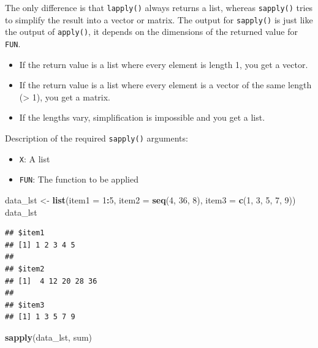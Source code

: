 \documentclass[
]{book}
\newenvironment{Shaded}{\begin{snugshade}}{\end{snugshade}}
\newcommand{\DataTypeTok}[1]{\textcolor[rgb]{0.13,0.29,0.53}{#1}}
\newcommand{\DecValTok}[1]{\textcolor[rgb]{0.00,0.00,0.81}{#1}}
\newcommand{\KeywordTok}[1]{\textcolor[rgb]{0.13,0.29,0.53}{\textbf{#1}}}
\newcommand{\NormalTok}[1]{#1}
\newcommand{\OperatorTok}[1]{\textcolor[rgb]{0.81,0.36,0.00}{\textbf{#1}}}
\newcommand{\StringTok}[1]{\textcolor[rgb]{0.31,0.60,0.02}{#1}}
\providecommand{\tightlist}{%
  \setlength{\itemsep}{0pt}\setlength{\parskip}{0pt}}
\begin{document}
The only difference is that \texttt{lapply()} always returns a list, whereas \texttt{sapply()} tries to simplify the result into a vector or matrix. The output for \texttt{sapply()} is just like the output of \texttt{apply()}, it depends on the dimensions of the returned value for \texttt{FUN}.

\begin{itemize}
\item
  If the return value is a list where every element is length 1, you get a vector.
\item
  If the return value is a list where every element is a vector of the same length (\textgreater{} 1), you get a matrix.
\item
  If the lengths vary, simplification is impossible and you get a list.
\end{itemize}

Description of the required \texttt{sapply()} arguments:

\begin{itemize}
\tightlist
\item
  \texttt{X}: A list
\item
  \texttt{FUN}: The function to be applied
\end{itemize}

\begin{Shaded}
\begin{Highlighting}[]
\NormalTok{data_lst <-}\StringTok{ }\KeywordTok{list}\NormalTok{(}\DataTypeTok{item1 =} \DecValTok{1}\OperatorTok{:}\DecValTok{5}\NormalTok{, }\DataTypeTok{item2 =} \KeywordTok{seq}\NormalTok{(}\DecValTok{4}\NormalTok{, }\DecValTok{36}\NormalTok{, }\DecValTok{8}\NormalTok{), }\DataTypeTok{item3 =} \KeywordTok{c}\NormalTok{(}\DecValTok{1}\NormalTok{,}
    \DecValTok{3}\NormalTok{, }\DecValTok{5}\NormalTok{, }\DecValTok{7}\NormalTok{, }\DecValTok{9}\NormalTok{))}
\NormalTok{data_lst}
\end{Highlighting}
\end{Shaded}

\begin{verbatim}
## $item1
## [1] 1 2 3 4 5
## 
## $item2
## [1]  4 12 20 28 36
## 
## $item3
## [1] 1 3 5 7 9
\end{verbatim}

\begin{Shaded}
\begin{Highlighting}[]
\KeywordTok{sapply}\NormalTok{(data_lst, sum)}
\end{Highlighting}
\end{Shaded}
\end{document}

